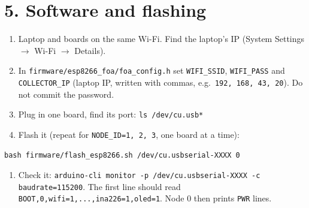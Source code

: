 \documentclass[10pt,a4paper]{article}
\begin{document}
\newpage
\section*{5. Software and flashing}
\begin{enumerate}
\item Laptop and boards on the same Wi-Fi. Find the laptop's IP (System Settings $\to$ Wi-Fi $\to$ Details).
\item In \texttt{firmware/esp8266\_foa/foa\_config.h} set \texttt{WIFI\_SSID}, \texttt{WIFI\_PASS} and
  \texttt{COLLECTOR\_IP} (laptop IP, written with commas, e.g.\ \texttt{192, 168, 43, 20}). Do not commit the password.
\item Plug in one board, find its port: \texttt{ls /dev/cu.usb*}
\item Flash it (repeat for \texttt{NODE\_ID=1, 2, 3}, one board at a time):
\end{enumerate}
{\small\begin{verbatim}
bash firmware/flash_esp8266.sh /dev/cu.usbserial-XXXX 0
\end{verbatim}}
\begin{enumerate}[resume]
\item Check it: \texttt{arduino-cli monitor -p /dev/cu.usbserial-XXXX -c baudrate=115200}. The first line
  should read \texttt{BOOT,0,wifi=1,...,ina226=1,oled=1}. Node 0 then prints \texttt{PWR} lines.
\end{enumerate}
\end{document}
